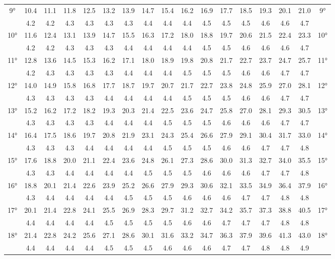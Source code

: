 \begin{scriptsize}
\begin{tabular}{c || c | c | c | c | c | c | c | c | c | c | c | c | c | c | c || c}
		\multirow{2}{*}{9°}&10.4&11.1&11.8&12.5&13.2&13.9&14.7&15.4&16.2&16.9&17.7&18.5&19.3&20.1&21.0&\multirow{2}{*}{9°}\\ \space&4.2&4.2&4.3&4.3&4.3&4.3&4.4&4.4&4.4&4.5&4.5&4.5&4.6&4.6&4.7&\space\\\hline
		\multirow{2}{*}{10°}&11.6&12.4&13.1&13.9&14.7&15.5&16.3&17.2&18.0&18.8&19.7&20.6&21.5&22.4&23.3&\multirow{2}{*}{10°}\\ \space&4.2&4.2&4.3&4.3&4.3&4.4&4.4&4.4&4.4&4.5&4.5&4.6&4.6&4.6&4.7&\space\\\hline
		\multirow{2}{*}{11°}&12.8&13.6&14.5&15.3&16.2&17.1&18.0&18.9&19.8&20.8&21.7&22.7&23.7&24.7&25.7&\multirow{2}{*}{11°}\\ \space&4.2&4.3&4.3&4.3&4.3&4.4&4.4&4.4&4.5&4.5&4.5&4.6&4.6&4.7&4.7&\space\\\hline
		\multirow{2}{*}{12°}&14.0&14.9&15.8&16.8&17.7&18.7&19.7&20.7&21.7&22.7&23.8&24.8&25.9&27.0&28.1&\multirow{2}{*}{12°}\\ \space&4.3&4.3&4.3&4.3&4.4&4.4&4.4&4.4&4.5&4.5&4.5&4.6&4.6&4.7&4.7&\space\\\hline
		\multirow{2}{*}{13°}&15.2&16.2&17.2&18.2&19.3&20.3&21.4&22.5&23.6&24.7&25.8&27.0&28.1&29.3&30.5&\multirow{2}{*}{13°}\\ \space&4.3&4.3&4.3&4.3&4.4&4.4&4.4&4.5&4.5&4.5&4.6&4.6&4.6&4.7&4.7&\space\\\hline
		\multirow{2}{*}{14°}&16.4&17.5&18.6&19.7&20.8&21.9&23.1&24.3&25.4&26.6&27.9&29.1&30.4&31.7&33.0&\multirow{2}{*}{14°}\\ \space&4.3&4.3&4.3&4.4&4.4&4.4&4.4&4.5&4.5&4.5&4.6&4.6&4.7&4.7&4.8&\space\\\hline
		\multirow{2}{*}{15°}&17.6&18.8&20.0&21.1&22.4&23.6&24.8&26.1&27.3&28.6&30.0&31.3&32.7&34.0&35.5&\multirow{2}{*}{15°}\\ \space&4.3&4.3&4.4&4.4&4.4&4.4&4.5&4.5&4.5&4.6&4.6&4.6&4.7&4.7&4.8&\space\\\hline
		\multirow{2}{*}{16°}&18.8&20.1&21.4&22.6&23.9&25.2&26.6&27.9&29.3&30.6&32.1&33.5&34.9&36.4&37.9&\multirow{2}{*}{16°}\\ \space&4.3&4.4&4.4&4.4&4.4&4.5&4.5&4.5&4.6&4.6&4.6&4.7&4.7&4.8&4.8&\space\\\hline
		\multirow{2}{*}{17°}&20.1&21.4&22.8&24.1&25.5&26.9&28.3&29.7&31.2&32.7&34.2&35.7&37.3&38.8&40.5&\multirow{2}{*}{17°}\\ \space&4.4&4.4&4.4&4.4&4.5&4.5&4.5&4.5&4.6&4.6&4.7&4.7&4.7&4.8&4.8&\space\\\hline
		\multirow{2}{*}{18°}&21.4&22.8&24.2&25.6&27.1&28.6&30.1&31.6&33.2&34.7&36.3&37.9&39.6&41.3&43.0&\multirow{2}{*}{18°}\\ \space&4.4&4.4&4.4&4.4&4.5&4.5&4.5&4.6&4.6&4.6&4.7&4.7&4.8&4.8&4.9&\space\\\hline

\end{tabular}
\end{scriptsize}
